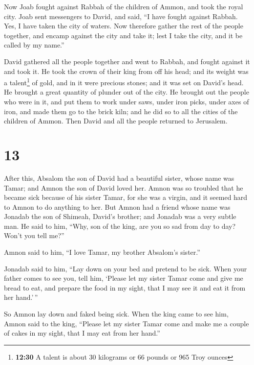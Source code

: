  Now Joab fought against Rabbah of the children of Ammon,
and took the royal city.  Joab sent messengers to David,
and said, ``I have fought against Rabbah. Yes, I have taken the city of
waters.  Now therefore gather the rest of the people
together, and encamp against the city and take it; lest I take the city,
and it be called by my name.''

 David gathered all the people together and went to
Rabbah, and fought against it and took it.  He took the
crown of their king from off his head; and its weight was a
talent\footnote{\textbf{12:30} A talent is about 30 kilograms or 66
  pounds or 965 Troy ounces} of gold, and in it were precious stones;
and it was set on David's head. He brought a great quantity of plunder
out of the city.  He brought out the people who were in
it, and put them to work under saws, under iron picks, under axes of
iron, and made them go to the brick kiln; and he did so to all the
cities of the children of Ammon. Then David and all the people returned
to Jerusalem.

\hypertarget{section-12}{%
\section{13}\label{section-12}}

 After this, Absalom the son of David had a beautiful
sister, whose name was Tamar; and Amnon the son of David loved her.
 Amnon was so troubled that he became sick because of his
sister Tamar, for she was a virgin, and it seemed hard to Amnon to do
anything to her.  But Amnon had a friend whose name was
Jonadab the son of Shimeah, David's brother; and Jonadab was a very
subtle man.  He said to him, ``Why, son of the king, are
you so sad from day to day? Won't you tell me?''

Amnon said to him, ``I love Tamar, my brother Absalom's sister.''

 Jonadab said to him, ``Lay down on your bed and pretend
to be sick. When your father comes to see you, tell him, `Please let my
sister Tamar come and give me bread to eat, and prepare the food in my
sight, that I may see it and eat it from her hand.'\,''

 So Amnon lay down and faked being sick. When the king
came to see him, Amnon said to the king, ``Please let my sister Tamar
come and make me a couple of cakes in my sight, that I may eat from her
hand.''

